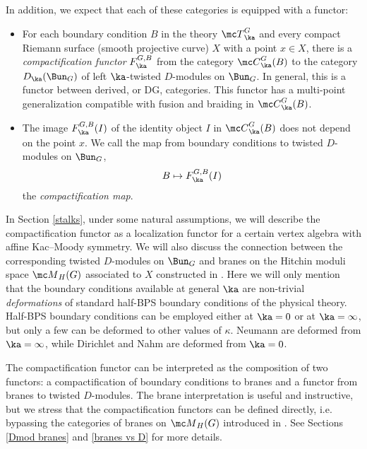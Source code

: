 \documentclass[11pt,reqno]{amsart}
\theoremstyle{plain}
\numberwithin{equation}{section}
\theoremstyle{definition}
\begin{document}
\bigskip

In addition, we expect that each of these categories is equipped with
a functor:

\medskip

\begin{itemize}

\item
For each boundary condition $B$ in the theory ${\mc
  T}^G_\ka$ and every compact Riemann surface (smooth projective
curve) $X$ with a point $x \in X$, there is a {\em compactification
  functor} $F^{G,B}_\ka$ from the category ${\mc C}^G_\ka(B)$ to the
category $D_\ka(\Bun_G)$ of left $\ka$-twisted $D$-modules on
$\Bun_G$. In general, this is a functor between derived, or DG,
categories. This functor has a multi-point generalization compatible
with fusion and braiding in ${\mc C}^G_\ka(B)$.

\medskip

\item
The image $F^{G,B}_\ka(I)$ of the identity object $I$ in ${\mc C}^G_\ka(B)$ 
does not depend on the point $x$. We call the map from boundary
conditions to twisted $D$-modules on $\Bun_G$,
$$
B \mapsto F^{G,B}_\ka(I)
$$
the {\em compactification map}.

\end{itemize}

\medskip

In Section \ref{stalks}, under some natural assumptions, we will
describe the compactification functor as a localization functor for a
certain vertex algebra with affine Kac--Moody symmetry. We will also
discuss the connection between the corresponding twisted $D$-modules
on $\Bun_G$ and branes on the Hitchin moduli space ${\mc M}_H(G)$
associated to $X$ constructed in \cite{KW}. Here we will only mention
that the boundary conditions available at general $\ka$ are
non-trivial {\it deformations} of standard half-BPS boundary
conditions of the physical theory. Half-BPS boundary conditions can be
employed either at $\ka=0$ or at $\ka=\infty$, but only a few can be
deformed to other values of $\kappa$. Neumann are deformed from
$\ka=\infty$, while Dirichlet and Nahm are deformed from $\ka=0$.

The compactification functor can be interpreted as the composition of
two functors: a compactification of boundary conditions to branes and
a functor from branes to twisted $D$-modules. The brane interpretation
is useful and instructive, but we stress that the compactification
functors can be defined directly, i.e. bypassing the categories of
branes on ${\mc M}_H(G)$ introduced in \cite{KW}. See Sections
\ref{Dmod branes} and \ref{branes vs D} for more details.
\end{document}
